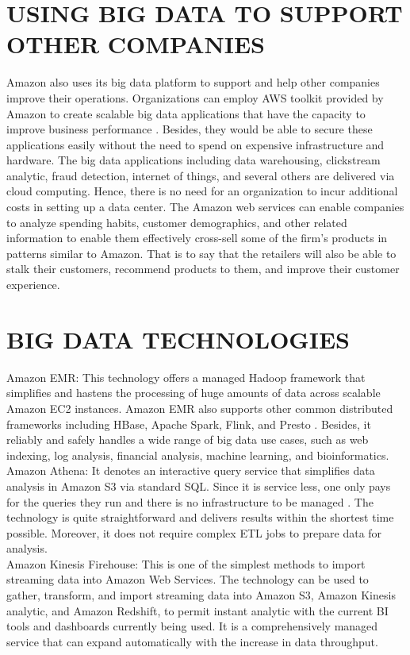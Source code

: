 \documentclass[sigconf]{acmart}
\begin{document}
\section{USING BIG DATA TO SUPPORT OTHER COMPANIES}
Amazon also uses its big data platform to support and help other companies improve their operations. Organizations can employ AWS toolkit provided by Amazon to create scalable big data applications that have the capacity to improve business performance \cite{Chen2012}. Besides, they would be able to secure these applications easily without the need to spend on expensive infrastructure and hardware. The big data applications including data warehousing, clickstream analytic, fraud detection, internet of things, and several others are delivered via cloud computing. Hence, there is no need for an organization to incur additional costs in setting up a data center. The Amazon web services can enable companies to analyze spending habits, customer demographics, and other related information to enable them effectively cross-sell some of the firm’s products in patterns similar to Amazon. That is to say that the retailers will also be able to stalk their customers, recommend products to them, and improve their customer experience.

\section{BIG DATA TECHNOLOGIES}
Amazon EMR: This technology offers a managed Hadoop framework that simplifies and hastens the processing of huge amounts of data across scalable Amazon EC2 instances. Amazon EMR also supports other common distributed frameworks including HBase, Apache Spark, Flink, and Presto \cite{Amazon2017}.  Besides, it reliably and safely handles a wide range of big data use cases, such as web indexing, log analysis, financial analysis, machine learning, and bioinformatics. \\
Amazon Athena: It denotes an interactive query service that simplifies data analysis in Amazon S3 via standard SQL. Since it is service less, one only pays for the queries they run and there is no infrastructure to be managed \cite{Amazon2017}. The technology is quite straightforward and delivers results within the shortest time possible. Moreover, it does not require complex ETL jobs to prepare data for analysis. \\
Amazon Kinesis Firehouse: This is one of the simplest methods to import streaming data into Amazon Web Services. The technology can be used to gather, transform, and import streaming data into Amazon S3, Amazon Kinesis analytic, and Amazon Redshift, to permit instant analytic with the current BI tools and dashboards currently being used.  It is a comprehensively managed service that can expand automatically with the increase in data throughput. 
\end{document}
